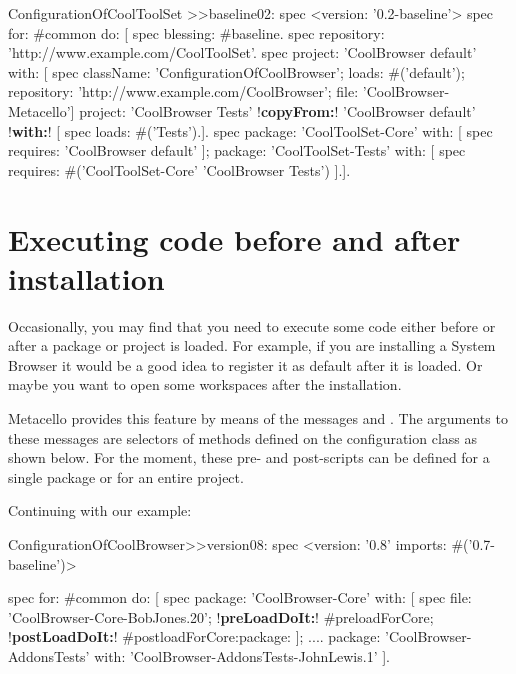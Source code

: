 \documentclass[a4paper,10pt,twoside]{book}
\begin{document}
\begin{code}{}
ConfigurationOfCoolToolSet >>baseline02: spec 
       <version: '0.2-baseline'>
       spec for: #common do: [
              spec blessing: #baseline.
              spec repository: 'http://www.example.com/CoolToolSet'.
              spec project: 'CoolBrowser default' with: [
                            spec
                                   className: 'ConfigurationOfCoolBrowser';
                                   loads: #('default');
                                   repository: 'http://www.example.com/CoolBrowser';
                                   file: 'CoolBrowser-Metacello']
                     project: 'CoolBrowser Tests' 
                            !\textbf{copyFrom:}! 'CoolBrowser default' 
                            !\textbf{with:}! [ spec loads: #('Tests').].
              spec 
                     package: 'CoolToolSet-Core' with: [ spec requires: 'CoolBrowser default' ];
                     package: 'CoolToolSet-Tests' with: [ 
                            spec requires: #('CoolToolSet-Core' 'CoolBrowser Tests') ].].                                   
\end{code}



\section{Executing code before and after installation}
Occasionally, you may find that you need to execute some code either before or after a package or project is loaded. For example, if you are installing a System Browser it would be a good idea to register it as default after it is loaded. Or maybe you want to open some workspaces after the installation. 

Metacello provides this feature by means of the messages  and .  The arguments to these messages are selectors of methods defined on the configuration class as shown below. For the moment, these pre- and post-scripts can be defined for a single package or for an entire project. 

Continuing with our example:

\begin{code}{}
ConfigurationOfCoolBrowser>>version08: spec 
       <version: '0.8' imports: #('0.7-baseline')>
       
       spec for: #common do: [
              spec 
                     package: 'CoolBrowser-Core' with: [
                            spec 
                                   file: 'CoolBrowser-Core-BobJones.20';
                                   !\textbf{preLoadDoIt:}! #preloadForCore;
                                   !\textbf{postLoadDoIt:}! #postloadForCore:package: ];
                     ....
                     package: 'CoolBrowser-AddonsTests' with: 'CoolBrowser-AddonsTests-JohnLewis.1' ].
\end{code}
\end{document}
